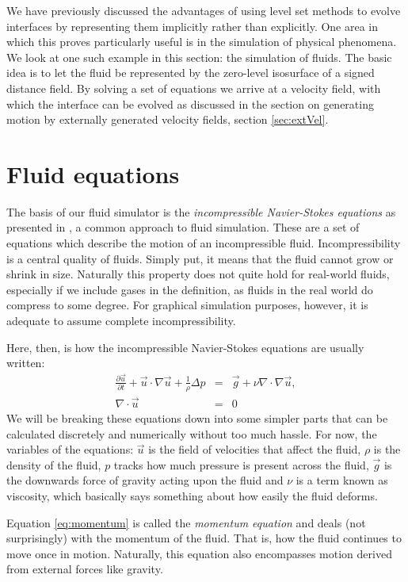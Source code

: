 We have previously discussed the advantages of using level set methods to evolve interfaces by representing them implicitly rather than explicitly. One area in which this proves particularly useful is in the simulation of physical phenomena. We look at one such example in this section: the simulation of fluids.
The basic idea is to let the fluid be represented by the zero-level isosurface of a signed distance field. By solving a set of equations we arrive at a velocity field, with which the interface can be evolved as discussed in the section on generating motion by externally generated velocity fields, section \vref{sec:extVel}.

\section{Fluid equations}
The basis of our fluid simulator is the \emph{incompressible Navier-Stokes equations} as presented in , a common approach to fluid simulation. These are a set of equations which describe the motion of an incompressible fluid. Incompressibility is a central quality of fluids. Simply put, it means that the fluid cannot grow or shrink in size. Naturally this property does not quite hold for real-world fluids, especially if we include gases in the definition, as fluids in the real world do compress to some degree. For graphical simulation purposes, however, it is adequate to assume complete incompressibility.

Here, then, is how the incompressible Navier-Stokes equations are usually written:
\begin{eqnarray}
\label{eq:momentum}
\frac{\partial\vec{u}}{\partial t}+\vec{u} \cdot \nabla\vec{u} + \frac{1}{\rho}\Delta p &=& \vec{g}+\nu\nabla\cdot\nabla\vec{u},\\
\label{eq:incomp}
\nabla\cdot\vec{u}&=&0
\end{eqnarray}
We will be breaking these equations down into some simpler parts that can be calculated discretely and numerically without too much hassle. For now, the variables of the equations: $\vec u$ is the field of velocities that affect the fluid, $\rho$ is the density of the fluid, $p$ tracks how much pressure is present across the fluid, $\vec{g}$ is the downwards force of gravity acting upon the fluid and $\nu$ is a term known as viscosity, which basically says something about how easily the fluid deforms.

Equation \vref{eq:momentum} is called the \emph{momentum equation} and deals (not surprisingly) with the momentum of the fluid. That is, how the fluid continues to move once in motion. Naturally, this equation also encompasses motion derived from external forces like gravity.


